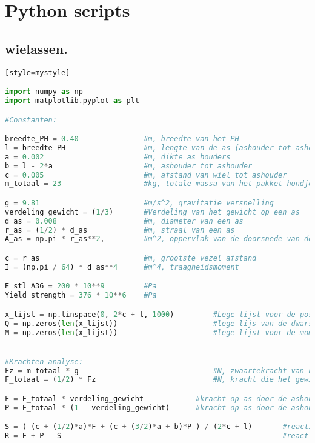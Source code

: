 \chapter{Python scripts}
\label{Cha: Bijlage_F}

\section{wielassen.}


\begin{lstlisting}[language=Python][style=mystyle]

import numpy as np
import matplotlib.pyplot as plt

#Constanten:

breedte_PH = 0.40               #m, breedte van het PH
l = breedte_PH                  #m, lengte van de as (ashouder tot ashouder)
a = 0.002                       #m, dikte as houders
b = l - 2*a                     #m, ashouder tot ashouder
c = 0.005                       #m, afstand van wiel tot ashouder
m_totaal = 23                   #kg, totale massa van het pakket hondje

g = 9.81                        #m/s^2, gravitatie versnelling
verdeling_gewicht = (1/3)       #Verdeling van het gewicht op een as
d_as = 0.008                    #m, diameter van een as
r_as = (1/2) * d_as             #m, straal van een as
A_as = np.pi * r_as**2,         #m^2, oppervlak van de doorsnede van de as

c = r_as                        #m, grootste vezel afstand
I = (np.pi / 64) * d_as**4      #m^4, traagheidsmoment

E_stl_A36 = 200 * 10**9         #Pa
Yield_strength = 376 * 10**6    #Pa     

x_lijst = np.linspace(0, 2*c + l, 1000)         #Lege lijst voor de positie
Q = np.zeros(len(x_lijst))                      #lege lijs van de dwarskrachten
M = np.zeros(len(x_lijst))                      #lege lijst voor de momenten in de as


#Krachten analyse:
Fz = m_totaal * g                               #N, zwaartekracht van het pakkethondje
F_totaal = (1/2) * Fz                           #N, kracht die het gewicht uitoefent op een as

F = F_totaal * verdeling_gewicht            #kracht op as door de ashouder bij de eerste ashouder, Newton
P = F_totaal * (1 - verdeling_gewicht)      #kracht op as door de ashouder bij de tweede ashouder, Newton

S = ( (c + (1/2)*a)*F + (c + (3/2)*a + b)*P ) / (2*c + l)       #reactiekracht bij het eerste wiel , Newton
R = F + P - S                                                   #reactiekracht bij het tweede wiel, Newton


\end{lstlisting}
